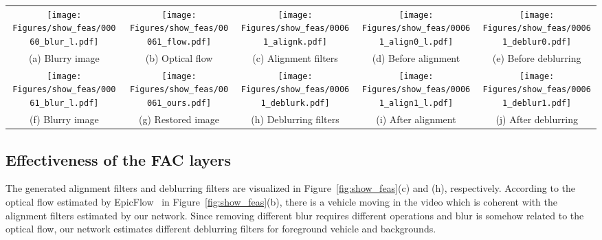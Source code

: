 \documentclass[10pt,twocolumn,letterpaper]{article}
\begin{document}
\begin{figure*}[t]\footnotesize
\centering
\renewcommand{\tabcolsep}{1pt}
\renewcommand{\arraystretch}{1}
\begin{center}
	\begin{tabular}{ccccc}
		\texttt{[image: Figures/show\_feas/00060\_blur\_l.pdf]} &
		\texttt{[image: Figures/show\_feas/00061\_flow.pdf]} &
		\texttt{[image: Figures/show\_feas/00061\_alignk.pdf]} &
		\texttt{[image: Figures/show\_feas/00061\_align0\_l.pdf]} &
		\texttt{[image: Figures/show\_feas/00061\_deblur0.pdf]} \\
		(a) Blurry image  & (b) Optical flow & (c) Alignment filters & (d) Before alignment & (e) Before deblurring
\vspace{1.5pt}\\
\texttt{[image: Figures/show\_feas/00061\_blur\_l.pdf]} &
		\texttt{[image: Figures/show\_feas/00061\_ours.pdf]}&
		\texttt{[image: Figures/show\_feas/00061\_deblurk.pdf]}&
		\texttt{[image: Figures/show\_feas/00061\_align1\_l.pdf]}&
		\texttt{[image: Figures/show\_feas/00061\_deblur1.pdf]}\\
		(f) Blurry image   & (g) Restored image & (h) Deblurring filters & (i) After alignment  & (j) After deblurring\\
\end{tabular}
\end{center}
\vspace{-4mm}
\caption{Effectiveness of the adaptive filter generator and  FAC layer.
(b) is the optical flow from the adjacent input blurry frames (a) and (f) according to EpicFlow~\cite{revaud2015epicflow}.
(c) and (h) are the visualization of the generated alignment and deblurring filters of FAC layers, respectively.
(d) and (i) are selected feature maps before and after alignment using FAC layer.
(e) and (j) are selected feature maps before and after deblurring using FAC layer.
	}
\label{fig:show_feas}
\vspace{-3mm}
\end{figure*}
\subsection{Effectiveness of the FAC layers}
The generated alignment filters and deblurring filters are visualized in Figure~\ref{fig:show_feas}(c) and (h), respectively.
According to the optical flow estimated by EpicFlow~\cite{revaud2015epicflow} in Figure~\ref{fig:show_feas}(b), there is a vehicle moving in the video which is coherent with the alignment filters estimated by our network.
Since removing different blur requires different operations and blur is somehow related to the optical flow, our network estimates different deblurring filters for foreground vehicle and backgrounds.
\end{document}

